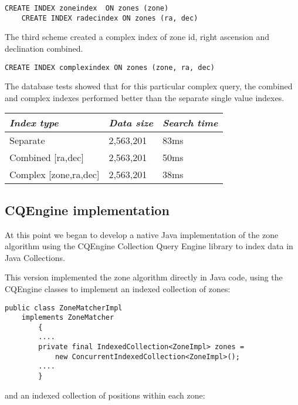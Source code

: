 \documentclass{article}
\newcommand{\cqengine} {CQEngine\xspace}
\begin{document}
\begin{lstlisting}[style=SQL]
    CREATE INDEX zoneindex  ON zones (zone)
    CREATE INDEX radecindex ON zones (ra, dec)
\end{lstlisting}

The third scheme created a complex index of zone id, right ascension and declination combined.

\begin{lstlisting}[style=SQL]
    CREATE INDEX complexindex ON zones (zone, ra, dec)
\end{lstlisting}

The database tests showed that for this particular complex query, the combined and complex indexes performed better than the separate single value indexes.

\begin{table}[h]
\centering
\begin{tabular}{|l|l|l|}
\hline
\textit{Index type} & \textit{Data size} & \textit{Search time} \\ \hline
Separate & 2,563,201 & 83ms \\ \hline
Combined [ra,dec] & 2,563,201 & 50ms \\ \hline
Complex  [zone,ra,dec] & 2,563,201 & 38ms \\ \hline
\end{tabular}
\end{table}

\subsection{CQEngine implementation}
\label{cqengine-implementation}

At this point we began to develop a native Java implementation of the zone algorithm using the \cqengine Collection Query Engine library to index data in Java Collections.

This version implemented the zone algorithm directly in Java code, using the \cqengine classes to implement an indexed collection of zones:

\begin{lstlisting}[style=Java]
    public class ZoneMatcherImpl
    implements ZoneMatcher
        {
        ....
        private final IndexedCollection<ZoneImpl> zones =
            new ConcurrentIndexedCollection<ZoneImpl>();
        ....
        }
\end{lstlisting}

and an indexed collection of positions within each zone:
\end{document}
